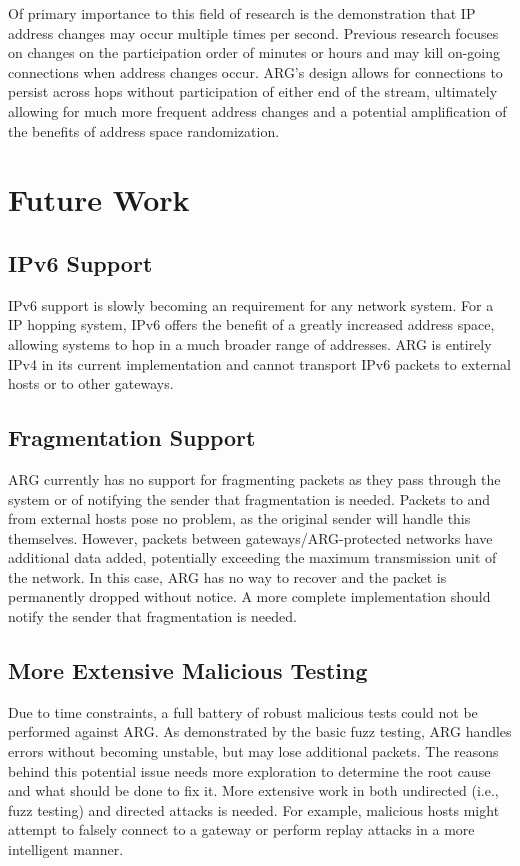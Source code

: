 \par Of primary importance to this field of research is the demonstration that \ac{IP} address changes may occur multiple times per second. Previous research focuses on changes on the participation order of minutes or hours and may kill on-going connections when address changes occur. ARG's design allows for connections to persist across hops without participation of either end of the stream, ultimately allowing for much more frequent address changes and a potential amplification of the benefits of address space randomization.

\section{Future Work}
\label{sec:future_work}
\subsection{IPv6 Support}
\par \ac{IPv6} support is slowly becoming an requirement for any network system. For a \ac{IP} hopping system, \ac{IPv6} offers the benefit of a greatly increased address space, allowing systems to hop in a much broader range of addresses. \ac{ARG} is entirely \ac{IPv4} in its current implementation and cannot transport \ac{IPv6} packets to external hosts or to other gateways.

\subsection{Fragmentation Support}
\par \ac{ARG} currently has no support for fragmenting packets as they pass through the system or of notifying the sender that fragmentation is needed. Packets to and from external hosts pose no problem, as the original sender will handle this themselves. However, packets between gateways/\ac{ARG}-protected networks have additional data added, potentially exceeding the maximum transmission unit of the network. In this case, \ac{ARG} has no way to recover and the packet is permanently dropped without notice. A more complete implementation should notify the sender that fragmentation is needed.

\subsection{More Extensive Malicious Testing}
\par Due to time constraints, a full battery of robust malicious tests could not be performed against \ac{ARG}. As demonstrated by the basic fuzz testing, \ac{ARG} handles errors without becoming unstable, but may lose additional packets. The reasons behind this potential issue needs more exploration to determine the root cause and what should be done to fix it. More extensive work in both undirected (i.e., fuzz testing) and directed attacks is needed. For example, malicious hosts might attempt to falsely connect to a gateway or perform replay attacks in a more intelligent manner.  

